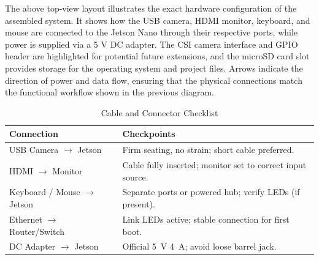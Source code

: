 The above top-view layout illustrates the exact hardware configuration of the assembled system.  
It shows how the USB camera, HDMI monitor, keyboard, and mouse are connected to the Jetson Nano through their respective ports, while power is supplied via a 5 V DC adapter.  
The CSI camera interface and GPIO header are highlighted for potential future extensions, and the microSD card slot provides storage for the operating system and project files.  
Arrows indicate the direction of power and data flow, ensuring that the physical connections match the functional workflow shown in the previous diagram.

\begin{table}[H]
	\centering
	\caption{Cable and Connector Checklist}
	\begin{tabular}{|L{4.2cm}|L{8.8cm}|}
		\hline
		\textbf{Connection} & \textbf{Checkpoints} \\ \hline
		USB Camera $\rightarrow$ Jetson & Firm seating, no strain; short cable preferred. \\ \hline
		HDMI $\rightarrow$ Monitor & Cable fully inserted; monitor set to correct input source. \\ \hline
		Keyboard / Mouse $\rightarrow$ Jetson & Separate ports or powered hub; verify LEDs (if present). \\ \hline
		Ethernet $\rightarrow$ Router/Switch & Link LEDs active; stable connection for first boot. \\ \hline
		DC Adapter $\rightarrow$ Jetson & Official \SI{5}{\volt} \SI{4}{\ampere}; avoid loose barrel jack. \\ \hline
	\end{tabular}
\end{table}